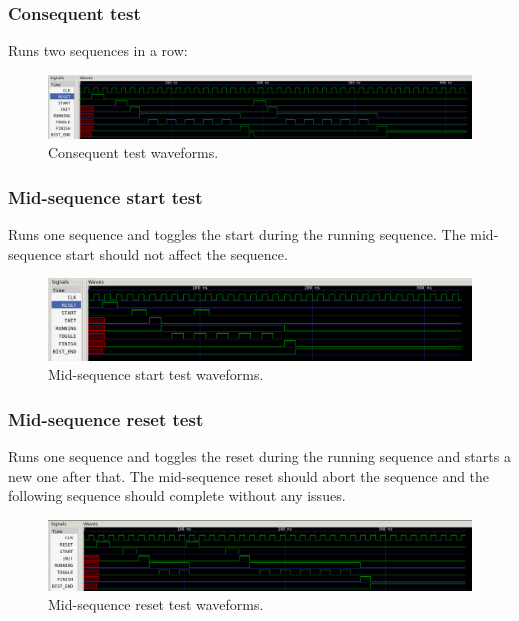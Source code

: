 \documentclass[12pt]{article}
\begin{document}
	\subsubsection*{Consequent test}
	Runs two sequences in a row:
	\begin{figure}[H]
        \centering
        \includegraphics[scale=0.45]{consequent_test.png}
            \caption{Consequent test waveforms.}
            \label{fig:normal_test}
    \end{figure}
	
	\subsubsection*{Mid-sequence start test}
	Runs one sequence and toggles the start during the running sequence. The mid-sequence start should not affect the sequence.
	\begin{figure}[H]
        \centering
        \includegraphics[scale=0.5]{midstart_test.png}
            \caption{Mid-sequence start test waveforms.}
            \label{fig:normal_test}
    \end{figure}
	
	\subsubsection*{Mid-sequence reset test}
	Runs one sequence and toggles the reset during the running sequence and starts a new one after that. The mid-sequence reset should abort the sequence and the following sequence should complete without any issues.
	\begin{figure}[H]
        \centering
        \includegraphics[scale=0.45]{midreset_test.png}
            \caption{Mid-sequence reset test waveforms.}
            \label{fig:normal_test}
    \end{figure}
	
\end{document}
